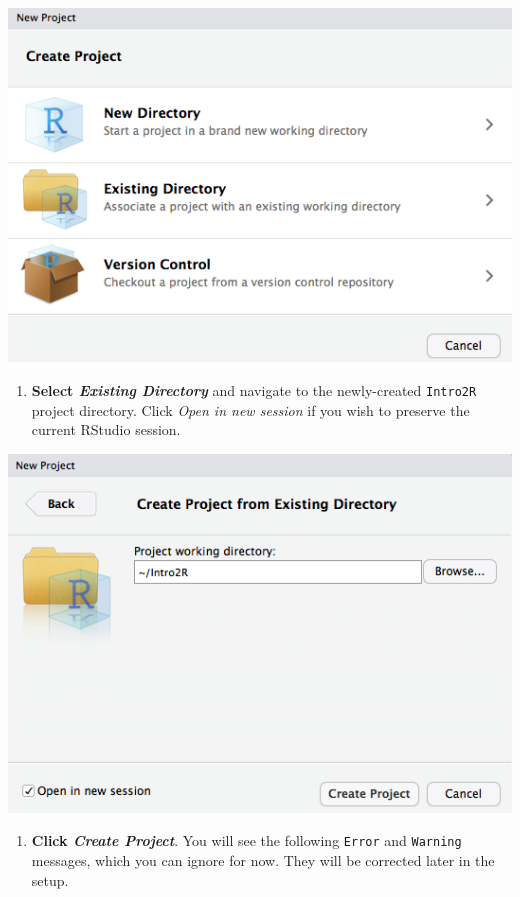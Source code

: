 \documentclass[]{book}
\providecommand{\tightlist}{%
  \setlength{\itemsep}{0pt}\setlength{\parskip}{0pt}}
\theoremstyle{definition}
\theoremstyle{definition}
\theoremstyle{definition}
\theoremstyle{remark}
\begin{document}
\includegraphics{images/RStudio_new_project_window.png}

\begin{enumerate}
\def\labelenumi{\arabic{enumi}.}
\setcounter{enumi}{4}
\tightlist
\item
  \textbf{Select \emph{Existing Directory}} and navigate to the
  newly-created \texttt{Intro2R} project directory. Click \emph{Open in
  new session} if you wish to preserve the current RStudio session.
\end{enumerate}

\includegraphics{images/RStudio_create_from_existing_directory_window.png}

\begin{enumerate}
\def\labelenumi{\arabic{enumi}.}
\setcounter{enumi}{5}
\tightlist
\item
  \textbf{Click \emph{Create Project}}. You will see the following
  \texttt{Error} and \texttt{Warning} messages, which you can ignore for
  now. They will be corrected later in the setup.
\end{enumerate}
\end{document}
